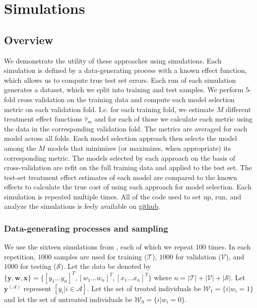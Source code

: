 \section{Simulations}
\label{simulations}

\subsection{Overview}

We demonstrate the utility of these approaches using simulations. Each simulation is defined by a data-generating process with a known effect function, which allows us to compute true test set errors. Each run of each simulation generates a dataset, which we split into training and test samples. We perform $5$-fold cross validation on the training data and compute each model selection metric on each validation fold. I.e. for each training fold, we estimate $M$ different treatment effect functions $\hat\tau_m$ and for each of those we calculate each metric using the data in the corresponding validation fold. The metrics are averaged for each model across all folds. Each model selection approach then selects the model among the $M$ models that minimizes (or maximizes, when appropriate) its corresponding metric. The models selected by each approach on the basis of cross-validation are refit on the full training data and applied to the test set. The test-set treatment effect estimates of each model are compared to the known effects to calculate the true cost of using each approach for model selection. Each simulation is repeated multiple times. All of the code used to set up, run, and analyze the simulations is feely available on \href{https://github.com/som-shahlab/ITE-model-selection}{github}.

\subsubsection{Data-generating processes and sampling}

We use the sixteen simulations from \citet{Powers:2017wd}, each of which we repeat $100$ times. In each repetition, $1000$ samples are used for training ($\mathcal{T}$), $1000$ for validation ($\mathcal{V}$), and $1000$ for testing ($\mathcal{S}$). Let the data be denoted by $\{\bm y, \bm w, \bm x\} = \{[y_1 \dots y_n]^T, [w_1 \dots w_n]^T, [x_1 \dots x_n]^T\}$ where $n = |\mathcal{T}| + |\mathcal{V} | + |\mathcal{S}|$. Let $\bm y^{(\mathcal A)}$ represent $[y_i | i \in \mathcal A]$. Let the set of treated individuals be $\mathcal W_1 = \{i | w_i =1\}$ and let the set of untreated individuals be $\mathcal W_0 = \{i | w_i =0\}$.

